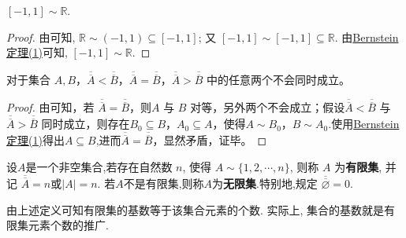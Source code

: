 \documentclass[../../main.tex]{subfiles}%
\begin{document}
\begin{example}\label{example:-1,1与R对等}
$[-1, 1] \sim \mathbb{R}$.
\end{example}
\begin{proof}
由可知, $\mathbb{R} \sim (-1, 1) \subseteq [-1, 1]$; 又 $[-1, 1] \sim [-1, 1] \subseteq \mathbb{R}$. 由\hyperref[theorem:Cantor-Bernstein定理]{Bernstein定理(1)}可知, $[-1, 1] \sim \mathbb{R}$.
\end{proof}

\begin{theorem}
对于集合 $A, B$，$\overline{\overline{A}} < \overline{\overline{B}}$，$\overline{\overline{A}} = \overline{\overline{B}}$，$\overline{\overline{A}} > \overline{\overline{B}}$ 中的任意两个不会同时成立。
\end{theorem}
\begin{proof}
由可知，若 $\overline{\overline{A}} = \overline{\overline{B}}$，则$A$ 与 $B$ 对等，另外两个不会成立；假设$\overline{\overline{A}} < \overline{\overline{B}}$ 与 $\overline{\overline{A}} > \overline{\overline{B}}$ 同时成立，则存在$B_0 \subseteq B$，$A_0 \subseteq A$，使得$A \sim B_0$，$B \sim A_0$.使用\hyperref[theorem:Cantor-Bernstein定理]{Bernstein定理(1)}得出$A \subseteq B$,进而$\overline{\overline{A}} = \overline{\overline{B}}$，显然矛盾，证毕。
\end{proof}

\begin{definition}[有限集与无限集]\label{definition:有限集与无限集}
设$A$是一个非空集合,若存在自然数 $n$, 使得 $A \sim \{1, 2, \cdots, n\}$, 则称 $A$ 为\textbf{有限集}, 并记 $\overline{\overline{A}} = n$或$|A|=n$. 若$A$不是有限集,则称$A$为\textbf{无限集}.特别地,规定 $\overline{\overline{\varnothing}} = 0$.
\end{definition}
\begin{note}
由上述定义可知有限集的基数等于该集合元素的个数. 实际上, 集合的基数就是有限集元素个数的推广.
\end{note}
\end{document}
